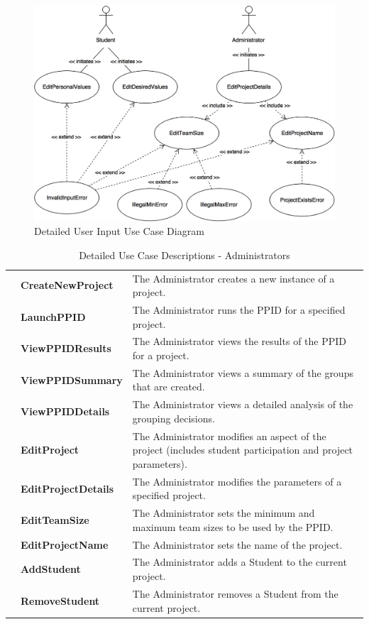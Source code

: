 \documentclass[12pt,letterpaper]{article}
\begin{document}
\begin{figure}[H]
	\centering{}
	\includegraphics[scale=0.3]{imgs/detailed-user-input-use-case-diagram.png}
	\caption{Detailed User Input Use Case Diagram}
\end{figure}

\begin{table}[H]
	\caption{Detailed Use Case Descriptions - Administrators}
	\vspace{1em}
	\begin{tabu} to 
		\createnewproject{} & CreateNewProject & The Administrator creates a new instance of a project.\\
		\launchppid{} & LaunchPPID & The Administrator runs the PPID for a specified project.\\
		\viewppidresults{} & ViewPPIDResults & The Administrator views the results of the PPID for a project. \\
		\viewppidsummary{} & ViewPPIDSummary & The Administrator views a summary of the groups that are created. \\
		\viewppiddetails{} & ViewPPIDDetails & The Administrator views a detailed analysis of the grouping decisions. \\
		\editproject{} & EditProject & The Administrator modifies an aspect of the project (includes student participation 
		and project parameters).\\
		\editprojectdetails{} & EditProjectDetails & The Administrator modifies the parameters of a specified project.\\
		\editteamsize{} & EditTeamSize & The Administrator sets the minimum and maximum team sizes to be used by the PPID. \\
		\editprojectname{} & EditProjectName & The Administrator sets the name of the project. \\
		\addstudent{} & AddStudent & The Administrator adds a Student to the current project.\\
		\removestudent{} & RemoveStudent & The Administrator removes a Student from the current project.\\
	\end{tabu}
\end{table}
\end{document}
